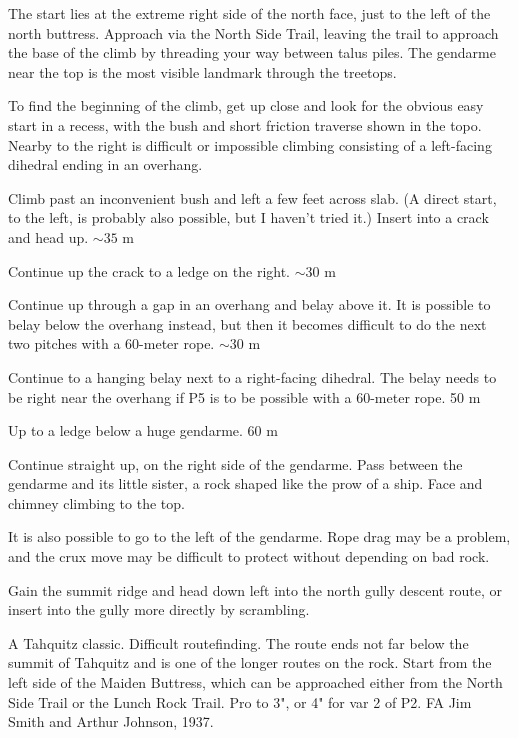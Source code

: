\documentclass{tahquitz}
\begin{document}
The start lies at  the extreme right side of the north face, just to
the left of the north buttress. Approach via the North Side Trail,
leaving the trail to approach the base of the climb by threading your
way between talus piles. The gendarme near the top is the most
visible landmark through the treetops.

To find the beginning of the climb, get up close and look for the
obvious easy start in a recess, with the bush and short friction
traverse shown in the topo. Nearby to the right is difficult or
impossible climbing consisting of a left-facing dihedral ending in an
overhang. 

 Climb past an inconvenient bush and left a few feet across slab.
(A direct start, to the left, is probably also possible, but I haven't tried it.)
Insert into a crack and head up. $\sim 35$ m

 Continue up the crack to a ledge on the right.  $\sim 30$ m

 Continue up through a gap in an overhang and belay above it.
It is possible to belay below the overhang instead, but then it becomes
difficult to do the next two pitches with a 60-meter rope. $\sim 30$ m

 Continue to a hanging
belay next to a right-facing dihedral. The belay needs to be right near the
overhang if P5 is to be possible with a 60-meter rope. 50 m

 Up to a ledge below a huge gendarme. 60 m

 Continue straight up, on the right side of the gendarme.
Pass between the gendarme and its little sister, a rock shaped like
the prow of a ship. Face and chimney climbing to the top.

 It is also possible to go to the left of the gendarme.
Rope drag may be a problem, and the crux move may be difficult to protect
without depending on bad rock.

Gain the summit ridge and head down left into the north gully descent route,
or insert into the gully more directly by scrambling.





A Tahquitz classic. Difficult routefinding. The route ends not far
below the summit of Tahquitz and is one of the longer routes on the
rock. Start from the left side of the Maiden Buttress, which can be
approached either from the North Side Trail or the Lunch Rock Trail.
Pro to 3", or 4" for var 2 of P2.
FA Jim Smith and Arthur Johnson, 1937.
\end{document}
